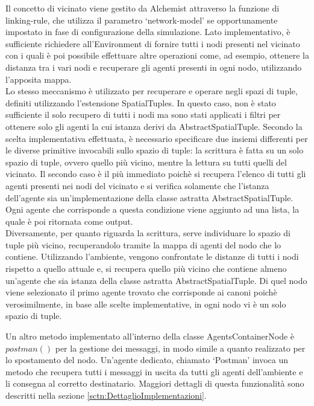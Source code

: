 Il concetto di vicinato viene gestito da Alchemist attraverso la funzione di linking-rule, che utilizza il parametro `network-model' se opportunamente impostato in fase di configurazione della simulazione.
Lato implementativo, è sufficiente richiedere all'Environment di fornire tutti i nodi presenti nel vicinato con i quali è poi possibile effettuare altre operazioni come, ad esempio, ottenere la distanza tra i vari nodi e recuperare gli agenti presenti in ogni nodo, utilizzando l'apposita mappa.
\\
Lo stesso meccanismo è utilizzato per recuperare e operare negli spazi di tuple, definiti utilizzando l'estensione SpatialTuples. In questo caso, non è stato sufficiente il solo recupero di tutti i nodi ma sono stati applicati i filtri per ottenere solo gli agenti la cui istanza derivi da AbstractSpatialTuple.
Secondo la scelta implementativa effettuata, è necessario specificare due insiemi differenti per le diverse primitive invocabili sullo spazio di tuple: la scrittura è fatta su un solo spazio di tuple, ovvero quello più vicino, mentre la lettura su tutti quelli del vicinato.
Il secondo caso è il più immediato poichè si recupera l'elenco di tutti gli agenti presenti nei nodi del vicinato e si verifica solamente che l'istanza dell'agente sia un'implementazione della classe astratta AbstractSpatialTuple. Ogni agente che corrisponde a questa condizione viene aggiunto ad una lista, la quale è poi ritornata come output.
\\
Diversamente, per quanto riguarda la scrittura, serve individuare lo spazio di tuple più vicino, recuperandolo tramite la mappa di agenti del nodo che lo contiene. Utilizzando l'ambiente, vengono confrontate le distanze di tutti i nodi rispetto a quello attuale e, si recupera quello più vicino che contiene almeno un'agente che sia istanza della classe astratta AbstractSpatialTuple. Di quel nodo viene selezionato il primo agente trovato che corrisponde ai canoni poichè verosimilmente, in base alle scelte implementative, in ogni nodo vi è un solo spazio di tuple.

Un altro metodo implementato all'interno della classe AgentsContainerNode è $postman()$ per la gestione dei messaggi, in modo simile a quanto realizzato per lo spostamento del nodo. Un'agente dedicato, chiamato `Postman' invoca un metodo che recupera tutti i messaggi in uscita da tutti gli agenti dell'ambiente e li consegna al corretto destinatario. Maggiori dettagli di questa funzionalità sono descritti nella sezione \ref{sctn:DettaglioImplementazioni}.


